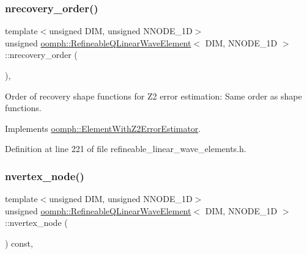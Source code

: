 \subsubsection{\texorpdfstring{nrecovery\+\_\+order()}{nrecovery\_order()}}
{\footnotesize\ttfamily template$<$unsigned D\+IM, unsigned N\+N\+O\+D\+E\+\_\+1D$>$ \\
unsigned \hyperlink{classoomph_1_1RefineableQLinearWaveElement}{oomph\+::\+Refineable\+Q\+Linear\+Wave\+Element}$<$ D\+IM, N\+N\+O\+D\+E\+\_\+1D $>$\+::nrecovery\+\_\+order (\begin{DoxyParamCaption}{ }\end{DoxyParamCaption})\hspace{0.3cm}{\ttfamily [inline]}, {\ttfamily [virtual]}}



Order of recovery shape functions for Z2 error estimation\+: Same order as shape functions. 



Implements \hyperlink{classoomph_1_1ElementWithZ2ErrorEstimator_af39480835bd3e0f6b2f4f7a9a4044798}{oomph\+::\+Element\+With\+Z2\+Error\+Estimator}.



Definition at line 221 of file refineable\+\_\+linear\+\_\+wave\+\_\+elements.\+h.

\mbox{\label{classoomph_1_1RefineableQLinearWaveElement_a79ebae3de0485161b4d47c904530ae85}} 
\subsubsection{\texorpdfstring{nvertex\+\_\+node()}{nvertex\_node()}}
{\footnotesize\ttfamily template$<$unsigned D\+IM, unsigned N\+N\+O\+D\+E\+\_\+1D$>$ \\
unsigned \hyperlink{classoomph_1_1RefineableQLinearWaveElement}{oomph\+::\+Refineable\+Q\+Linear\+Wave\+Element}$<$ D\+IM, N\+N\+O\+D\+E\+\_\+1D $>$\+::nvertex\+\_\+node (\begin{DoxyParamCaption}{ }\end{DoxyParamCaption}) const\hspace{0.3cm}{\ttfamily [inline]}, {\ttfamily [virtual]}}




